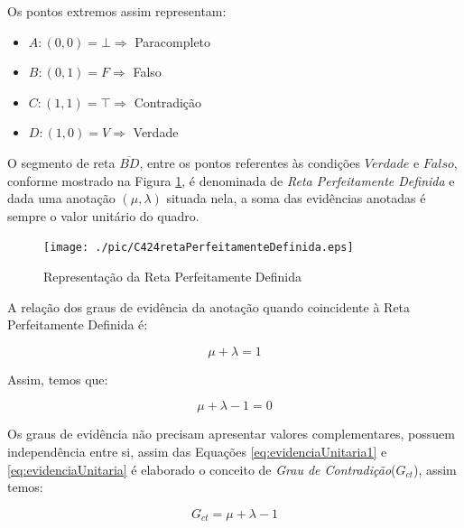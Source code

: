 Os pontos extremos assim representam:

\begin{itemize}
\item $A: (0,0) = \bot \Rightarrow $ Paracompleto
\item $B: (0,1) = F \Rightarrow $ Falso
\item $C: (1,1) = \top \Rightarrow $ Contradição
\item $D: (1,0) = V \Rightarrow $ Verdade
\end{itemize}

O segmento de reta $\overline{BD}$, entre os pontos referentes às condições $Verdade$ e $Falso$, conforme mostrado na Figura \ref{fig:retaPerfeitamenteDefinida}, é denominada de \emph{Reta Perfeitamente Definida} e dada uma anotação $(\mu, \lambda )$ situada nela, a soma das evidências anotadas é sempre o valor unitário do quadro. 

\begin{figure}[!htb]
\center\texttt{[image: ./pic/C424retaPerfeitamenteDefinida.eps]}
\caption{Representação da Reta Perfeitamente Definida}
\label{fig:retaPerfeitamenteDefinida}
\end{figure}

A relação dos graus de evidência da anotação quando coincidente à Reta Perfeitamente Definida é: 

\begin{center}
\begin{equation}
\mu + \lambda = 1
\label{eq:evidenciaUnitaria1}
\end{equation}
\end{center}

Assim, temos que:

\begin{center}
\begin{equation}
\mu + \lambda - 1 = 0
\label{eq:evidenciaUnitaria}
\end{equation}
\end{center}


Os graus de evidência não precisam apresentar valores complementares, possuem independência entre si, assim das Equações  
\ref{eq:evidenciaUnitaria1} e 
\ref{eq:evidenciaUnitaria} 
é elaborado o conceito de 
\emph{Grau de Contradição}($G_{ct}$), 
assim temos: 

\begin{center}
\begin{equation}
G _{ct} = \mu + \lambda - 1
\label{eq:grauIncerteza}
\end{equation}
\end{center}

